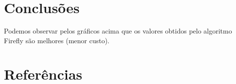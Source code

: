 \documentclass[10pt]{article}
\begin{document}
\section{Conclusões}\label{sec:an-da-info-fin-da-org}
  Podemos observar pelos gráficos acima que os valores obtidos pelo algoritmo Firefly são melhores (menor custo).

\vspace{1cm}

\section{Referências}\label{sec:sup-inf-utl}






\pagebreak
\end{document}
